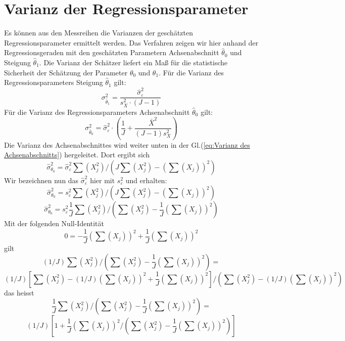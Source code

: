 \section{Varianz der Regressionsparameter}
\label{subsec:vertrauensbereiche}
Es können aus den Messreihen die Varianzen der
geschätzten Regressionsparameter ermittelt werden. Das Verfahren zeigen wir
hier anhand der Regressionsgeraden mit den geschätzten Parametern
Achsenabschnitt $\hat{\theta}_0 $ und Steigung $\hat\theta_1 $.
Die Varianz der Schätzer liefert ein Ma{\ss} f\"{u}r die statistische
Sicherheit der Sch\"{a}tzung der Parameter $\theta _0 $ und
$\theta _1 $.
Für die Varianz des Regressionsparameters Steigung $\hat{\theta}_1 $
gilt:
\begin{equation}
\sigma^2_{\hat{\theta}_1} = \frac{ \hat \sigma^2_{\varepsilon}}{s^2_X \cdot (J- 1) }
\end{equation}
Für die Varianz des Regressionsparameters Achsenabschnitt $\hat{\theta}_0 $
gilt:
\begin{equation}
\sigma^2_{\hat{\theta}_0} = \hat \sigma^2_{\varepsilon} \cdot \left(\frac{1}{J}
	+ \frac{\bar {X}^2}{(J - 1) s_X^2 }\right)
\end{equation}
Die Varianz des Achsenabschnittes wird weiter unten in der Gl.(\ref{eq:Varianz des Achsenabschnitts}) hergeleitet. Dort ergibt sich \begin{equation}
\hat \sigma^2_{\theta_0}  = \hat \sigma^2_{\varepsilon}  \sum(X_j^2)  / (J \sum(X_j^2) - (\sum(X_j))^2)
\end{equation}
Wir bezeichnen nun das $\hat \sigma^2_{\varepsilon}$ hier mit $s^2_{\varepsilon}$ und erhalten:
\begin{equation}
\hat \sigma^2_{\theta_0}  = s^2_{\varepsilon} \sum(X_j^2)  / (J \sum(X_j^2) - (\sum(X_j))^2)
\end{equation}
\begin{equation}
\hat \sigma^2_{\theta_0} = s^2_{\varepsilon} \frac{1}{J} \sum(X_j^2)  / (\sum(X_j^2) - \frac{1}{J}(\sum(X_j))^2)
\end{equation}
Mit der folgenden Null-Identität
\begin{equation}
0 =  - \frac{1}{J}(\sum(X_j))^2 + \frac{1}{J}(\sum(X_j))^2
\end{equation}
gilt
\[
(1/J) \sum(X_j^2)  / (\sum(X_j^2) - \frac{1}{J}(\sum(X_j))^2) =
\]
\[
(1/J) [\sum(X_j^2) - (1/J)(\sum(X_j))^2 + \frac{1}{J}(\sum(X_j))^2] / (\sum(X_j^2) - (1/J)(\sum(X_j))^2)
\]
das heisst
\[
\frac{1}{J} \sum(X_j^2)  / (\sum(X_j^2) - \frac{1}{J}(\sum(X_j))^2) =
\]
\[
(1/J) [ 1 + \frac{1}{J}(\sum(X_j))^2 / (\sum(X_j^2) - \frac{1}{J}(\sum(X_j))^2) ]
\]

